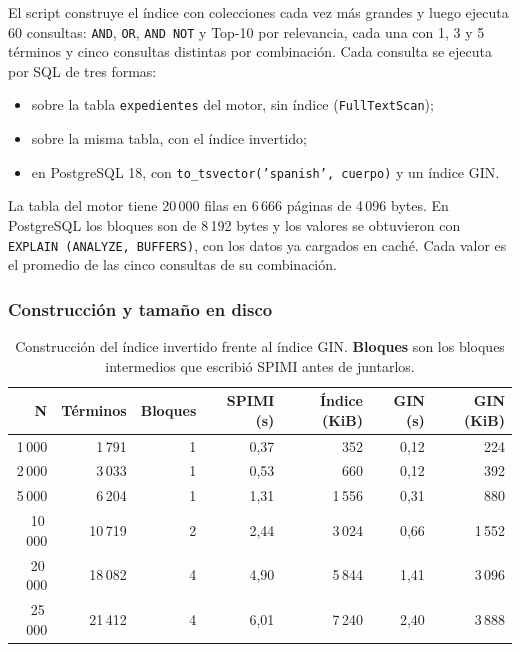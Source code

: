 El script construye el índice con colecciones cada vez más grandes y luego
ejecuta 60 consultas: \texttt{AND}, \texttt{OR}, \texttt{AND NOT} y Top-10 por
relevancia, cada una con 1, 3 y 5 términos y cinco consultas distintas por
combinación. Cada consulta se ejecuta por SQL de tres formas:

\begin{itemize}
    \item sobre la tabla \texttt{expedientes} del motor, sin índice
    (\texttt{FullTextScan});
    \item sobre la misma tabla, con el índice invertido;
    \item en PostgreSQL 18, con \texttt{to\_tsvector('spanish', cuerpo)} y un
    índice GIN.
\end{itemize}

La tabla del motor tiene 20\,000 filas en 6\,666 páginas de 4\,096 bytes. En
PostgreSQL los bloques son de 8\,192 bytes y los valores se obtuvieron con
\texttt{EXPLAIN (ANALYZE, BUFFERS)}, con los datos ya cargados en caché. Cada
valor es el promedio de las cinco consultas de su combinación.

\subsubsection{Construcción y tamaño en disco}

\begin{table}[H]
\centering
\caption{Construcción del índice invertido frente al índice GIN.
\textbf{Bloques} son los bloques intermedios que escribió SPIMI antes de
juntarlos.}
\begin{tabular}{@{}rrrrrrr@{}}
\toprule
\textbf{N} & \textbf{Términos} & \textbf{Bloques} & \textbf{SPIMI (s)} &
\textbf{Índice (KiB)} & \textbf{GIN (s)} & \textbf{GIN (KiB)} \\
\midrule
1\,000 & 1\,791 & 1 & 0{,}37 & 352 & 0{,}12 & 224 \\
2\,000 & 3\,033 & 1 & 0{,}53 & 660 & 0{,}12 & 392 \\
5\,000 & 6\,204 & 1 & 1{,}31 & 1\,556 & 0{,}31 & 880 \\
10\,000 & 10\,719 & 2 & 2{,}44 & 3\,024 & 0{,}66 & 1\,552 \\
20\,000 & 18\,082 & 4 & 4{,}90 & 5\,844 & 1{,}41 & 3\,096 \\
25\,000 & 21\,412 & 4 & 6{,}01 & 7\,240 & 2{,}40 & 3\,888 \\
\bottomrule
\end{tabular}
\end{table}


